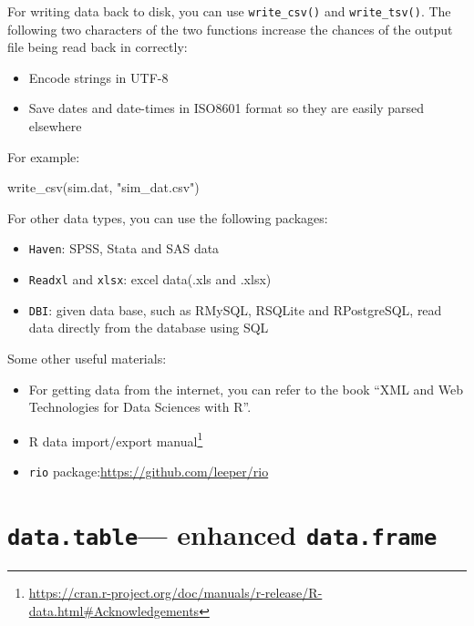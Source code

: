 \documentclass[
  12pt,
]{krantz}
\makeatletter
\newenvironment{Shaded}{\begin{snugshade}}{\end{snugshade}}
\newcommand{\FunctionTok}[1]{\textcolor[rgb]{0,0,0}{#1}}
\newcommand{\NormalTok}[1]{#1}
\newcommand{\StringTok}[1]{\textcolor[rgb]{0.5,0.5,0.5}{#1}}
\providecommand{\tightlist}{%
  \setlength{\itemsep}{0pt}\setlength{\parskip}{0pt}}
\renewcommand{\href}[2]{#2\footnote{\url{#1}}}
\newenvironment{kframe}{%
\medskip{}
\setlength{\fboxsep}{.8em}
 \def\at@end@of@kframe{}%
 \ifinner\ifhmode%
  \def\at@end@of@kframe{\end{minipage}}%
  \begin{minipage}{\columnwidth}%
 \fi\fi%
 \def\FrameCommand##1{\hskip\@totalleftmargin \hskip-\fboxsep
 \colorbox{shadecolor}{##1}\hskip-\fboxsep
     \hskip-\linewidth \hskip-\@totalleftmargin \hskip\columnwidth}%
 \MakeFramed {\advance\hsize-\width
   \@totalleftmargin\z@ \linewidth\hsize
   \@setminipage}}%
 {\par\unskip\endMakeFramed%
 \at@end@of@kframe}
\renewenvironment{Shaded}{\begin{kframe}}{\end{kframe}}
\makeatother
\begin{document}
For writing data back to disk, you can use \texttt{write\_csv()} and \texttt{write\_tsv()}. The following two characters of the two functions increase the chances of the output file being read back in correctly:

\begin{itemize}
\tightlist
\item
  Encode strings in UTF-8
\item
  Save dates and date-times in ISO8601 format so they are easily parsed elsewhere
\end{itemize}

For example:

\begin{Shaded}
\begin{Highlighting}[]
\FunctionTok{write\_csv}\NormalTok{(sim.dat, }\StringTok{"sim\_dat.csv"}\NormalTok{)}
\end{Highlighting}
\end{Shaded}

For other data types, you can use the following packages:

\begin{itemize}
\tightlist
\item
  \texttt{Haven}: SPSS, Stata and SAS data
\item
  \texttt{Readxl} and \texttt{xlsx}: excel data(.xls and .xlsx)
\item
  \texttt{DBI}: given data base, such as RMySQL, RSQLite and RPostgreSQL, read data directly from the database using SQL
\end{itemize}

Some other useful materials:

\begin{itemize}
\tightlist
\item
  For getting data from the internet, you can refer to the book ``XML and Web Technologies for Data Sciences with R''.\\
\item
  \href{https://cran.r-project.org/doc/manuals/r-release/R-data.html\#Acknowledgements}{R data import/export manual}
\item
  \texttt{rio} package:\url{https://github.com/leeper/rio}
\end{itemize}

\hypertarget{data.table-enhanced-data.frame}{%
\section{\texorpdfstring{\texttt{data.table}--- enhanced \texttt{data.frame}}{data.table--- enhanced data.frame}}\label{data.table-enhanced-data.frame}}
\end{document}
